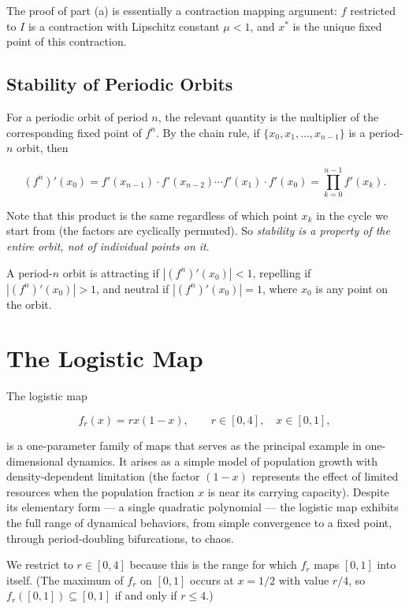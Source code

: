 \begin{remark}
The proof of part (a) is essentially a contraction mapping argument: $f$ restricted to $I$ is a contraction with Lipschitz constant $\mu < 1$, and $x^*$ is the unique fixed point of this contraction.
\end{remark}


\subsection{Stability of Periodic Orbits}\label{sec:2.3.2}

For a periodic orbit of period $n$, the relevant quantity is the multiplier of the corresponding fixed point of $f^n$. By the chain rule, if $\{x_0, x_1, \ldots, x_{n-1}\}$ is a period-$n$ orbit, then

\[
(f^n)'(x_0) = f'(x_{n-1}) \cdot f'(x_{n-2}) \cdots f'(x_1) \cdot f'(x_0) = \prod_{k=0}^{n-1} f'(x_k).
\]

Note that this product is the same regardless of which point $x_k$ in the cycle we start from (the factors are cyclically permuted). So \textit{stability is a property of the entire orbit, not of individual points on it}.

\begin{definition}\label{def:2.9.}
A period-$n$ orbit is attracting if $|(f^n)'(x_0)| < 1$, repelling if $|(f^n)'(x_0)| > 1$, and neutral if $|(f^n)'(x_0)| = 1$, where $x_0$ is any point on the orbit.
\end{definition}


\section{The Logistic Map}\label{sec:2.4}

The logistic map

\[
f_r(x) = rx(1-x), \qquad r \in [0,4], \quad x \in [0,1],
\]

is a one-parameter family of maps that serves as the principal example in one-dimensional dynamics. It arises as a simple model of population growth with density-dependent limitation (the factor $(1-x)$ represents the effect of limited resources when the population fraction $x$ is near its carrying capacity). Despite its elementary form --- a single quadratic polynomial --- the logistic map exhibits the full range of dynamical behaviors, from simple convergence to a fixed point, through period-doubling bifurcations, to chaos.

We restrict to $r \in [0,4]$ because this is the range for which $f_r$ maps $[0,1]$ into itself. (The maximum of $f_r$ on $[0,1]$ occurs at $x = 1/2$ with value $r/4$, so $f_r([0,1]) \subseteq [0,1]$ if and only if $r \leq 4$.)

